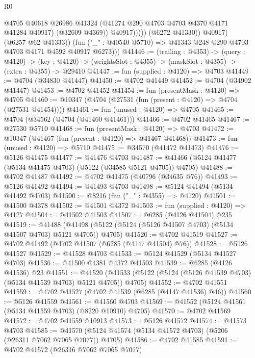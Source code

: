 \begin{lexlean}{R0}
\begin{coremodule}
                          @4705
                          @40618
                          @26986
                          @41324
                          (@41274 @290 @4703 @4703 @4370 @4171 @41284 @40917)
                          (@32609 @4369))
                        @40917)))))
              (@6272 @41330))
            @40917)
          (@6257 @62 @41333))
        (fun ("_" : @40540 @5710) => @41343 @248 @290 @4703 @4703 @4171 @4592 @40917 @6273)))
@41446 := (trailing : @4353) ->
  (query : @4120) ->
  (key : @4120) -> (weightsSlot : @4355) -> (maskSlot : @4355) -> (extra : @4355) -> @29410
@41447 := fun (supplied : @4120) => @4703
@41449 := @4704 (@34830 @41447)
@41450 := @4702 @41449
@41452 := @4704 (@34902 @41447)
@41453 := @4702 @41452
@41454 := fun (presentMask : @4120) => @4705
@41460 := @10347 (@4704 (@27531 (fun (present : @4120) => @4704 (@27531 @41454))))
@41461 := fun (unused : @4120) => @4705
@41465 := @4704 (@34562 (@4704 (@41460 @41461)))
@41466 := @4702 @41465
@41467 := @27530 @5710
@41468 := fun (presentMask : @4120) => @4703
@41472 := @10347 (@41467 (fun (present : @4120) => @41467 @41468))
@41473 := fun (unused : @4120) => @5710
@41475 := @34570 (@41472 @41473)
@41476 := @5126 @41475
@41477 := @41476 @4703
@41487 := @41466 (@5124 @41477 (@5134 @41475 @4703) (@5122 (@34585 @5121 @4705)) @4705)
@41488 := @4702 @41487
@41492 := @4702 @41475 (@40796 (@34635 @76))
@41493 := @5126 @41492
@41494 := @41493 @4703
@41498 := @5124 @41494 (@5134 @41492 @4703)
@41500 := @8216 (fun ("_" : @4355) => @4120)
@41501 := @41500 @4378
@41502 := @41501 @4372
@41503 := fun (supplied : @4120) => @4127
@41504 := @41502 @41503
@41507 := @6285 (@4126 @41504) @235
@41519 := @41488
    (@41498 (@5122 (@5124 (@5126 @41507 @4703) (@5134 @41507 @4703) @5121 @4705)) @4705)
@41520 := @4702 @41519
@41527 := @4702 @41492 (@4702 @41507 (@6285 (@4147 @41504) @76))
@41528 := @5126 @41527
@41529 := @41528 @4703
@41533 := @5124 @41529 (@5134 @41527 @4703)
@41536 := @41500 @4381 @4372 @41503
@41539 := @6285 (@4126 @41536) @23
@41551 := @41520
    (@41533 (@5122 (@5124 (@5126 @41539 @4703) (@5134 @41539 @4703) @5121 @4705)) @4705)
@41552 := @4702 @41551
@41559 := @4702 @41527 (@4702 @41539 (@6285 (@4147 @41536) @46))
@41560 := @5126 @41559
@41561 := @41560 @4703
@41569 := @41552 (@5124 @41561 (@5134 @41559 @4703) (@8220 @10910) @4705)
@41570 := @4702 @41569
@41572 := @4702 @41559 @10913
@41573 := @5126 @41572
@41574 := @41573 @4703
@41585 := @41570 (@5124 @41574 (@5134 @41572 @4703) (@5206 (@26311 @7062 @7065 @7077)) @4705)
@41586 := @4702 @41585
@41591 := @4702 @41572 (@26316 @7062 @7065 @7077)

\end{coremodule}
\end{lexlean}
